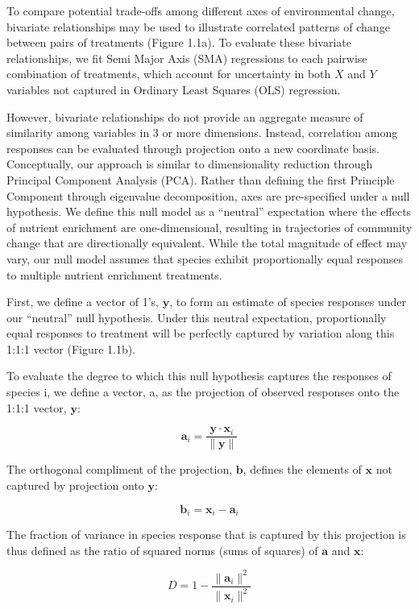 \documentclass[twoside,12pt,final]{ucthesis-CA2012}
\begin{document}
\begin{ucmainmatter}
To compare potential trade-offs among different axes of environmental change, bivariate relationships may be used to illustrate correlated patterns of change between pairs of treatments (Figure 1.1a). To evaluate these bivariate relationships, we fit Semi Major Axis (SMA) regressions to each pairwise combination of treatments, which account for uncertainty in both \(X\) and \(Y\) variables not captured in Ordinary Least Squares (OLS) regression.

However, bivariate relationships do not provide an aggregate measure of similarity among variables in 3 or more dimensions. Instead, correlation among responses can be evaluated through projection onto a new coordinate basis. Conceptually, our approach is similar to dimensionality reduction through Principal Component Analysis (PCA). Rather than defining the first Principle Component through eigenvalue decomposition, axes are pre-specified under a null hypothesis. We define this null model as a ``neutral'' expectation where the effects of nutrient enrichment are one-dimensional, resulting in trajectories of community change that are directionally equivalent. While the total magnitude of effect may vary, our null model assumes that species exhibit proportionally equal responses to multiple nutrient enrichment treatments.

First, we define a vector of 1's, \(\mathbf{y}\), to form an estimate of species responses under our ``neutral'' null hypothesis. Under this neutral expectation, proportionally equal responses to treatment will be perfectly captured by variation along this 1:1:1 vector (Figure 1.1b).

To evaluate the degree to which this null hypothesis captures the responses of species i, we define a vector, a, as the projection of observed responses onto the 1:1:1 vector, \(\mathbf{y}\):

\[\mathbf{a}_i = \frac{\mathbf{y} \cdot \mathbf{x}_i}{\|\mathbf{y}\|}\]

The orthogonal compliment of the projection, \(\mathbf{b}\), defines the elements of \(\mathbf{x}\) not captured by projection onto \(\mathbf{y}\):

\[\mathbf{b}_i = \mathbf{x}_i - \mathbf{a}_i\]

The fraction of variance in species response that is captured by this projection is thus defined as the ratio of squared norms (sums of squares) of \(\mathbf{a}\) and \(\mathbf{x}\):

\[D = 1 - \frac{\|\mathbf{a}_i\|^2}{\|\mathbf{x}_i\|^2}\]


\end{ucmainmatter}
\end{document}
